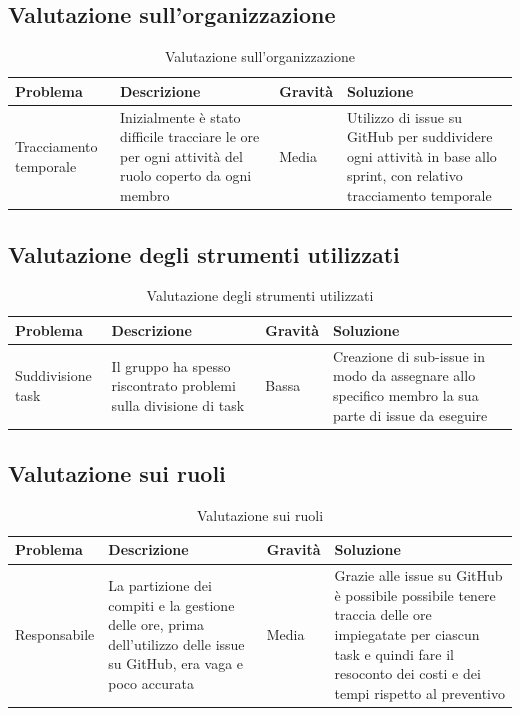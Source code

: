 \documentclass[a4paper,10pt]{article}
\begin{document}
\subsection{Valutazione sull'organizzazione}
\begin{table}[H]
\centering
\renewcommand{\arraystretch}{1.2}
\begin{tabular}{|p{3cm}|p{4cm}|p{2cm}|p{4cm}|}
\hline
\textbf{Problema} & \textbf{Descrizione} & \textbf{Gravità} & \textbf{Soluzione} \\
\hline
Tracciamento temporale &
Inizialmente è stato difficile tracciare le ore per ogni attività del ruolo coperto da ogni membro &
Media &
Utilizzo di issue su GitHub per suddividere ogni attività in base allo sprint, con relativo tracciamento temporale \\
\hline
\end{tabular}
\caption{Valutazione sull’organizzazione}
\label{tab:valutazione-organizzazione}
\end{table}

\subsection{Valutazione degli strumenti utilizzati}
\begin{table}[H]
\centering
\renewcommand{\arraystretch}{1.2}
\begin{tabular}{|p{3cm}|p{4cm}|p{2cm}|p{4cm}|}
\hline
\textbf{Problema} & \textbf{Descrizione} & \textbf{Gravità} & \textbf{Soluzione} \\
\hline
Suddivisione task &
Il gruppo ha spesso riscontrato problemi sulla divisione di task &
Bassa &
Creazione di sub-issue in modo da assegnare allo specifico membro la sua parte di issue da eseguire \\
\hline
\end{tabular}
\caption{Valutazione degli strumenti utilizzati}
\label{tab:valutazione-strmenti}
\end{table}

\subsection{Valutazione sui ruoli}
\begin{table}[H]
\centering
\renewcommand{\arraystretch}{1.2}
\begin{tabular}{|p{3cm}|p{4cm}|p{2cm}|p{4cm}|}
\hline
\textbf{Problema} & \textbf{Descrizione} & \textbf{Gravità} & \textbf{Soluzione} \\
\hline
Responsabile &
La partizione dei compiti e la gestione delle ore, prima dell'utilizzo delle issue su GitHub, era vaga e poco accurata &
Media &
Grazie alle issue su GitHub è possibile possibile tenere traccia delle ore impiegatate per ciascun task e quindi fare il resoconto dei costi e dei tempi rispetto al preventivo \\
\hline
\end{tabular}
\caption{Valutazione sui ruoli}
\label{tab:valutazione-ruoli}
\end{table}
\end{document}
